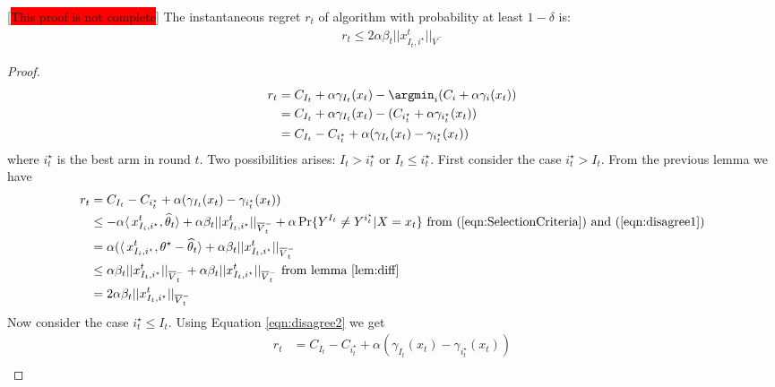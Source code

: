 \begin{theorem}
	\label{thm:ir}[\colorbox{red}{This proof is not complete}]
	The instantaneous regret $r_t$ of algorithm with probability at least $1-\delta$ is:
	\begin{align*}
	r_t \le 2\alpha \beta_t ||x_{I_t, i^\star}^t||_{\overline{V}^-}
	\end{align*}
\end{theorem}
\begin{proof}
	\begin{align*}
	r_t &= C_{I_t} + \alpha\gamma_{I_t}(x_t) - \argmin_i(C_i + \alpha\gamma_i(x_t)) \\
	&= C_{I_t} + \alpha\gamma_{I_t}(x_t) - (C_{i^\star_t} + \alpha\gamma_{i^\star_t}(x_t)) \\
	&= C_{I_t} - C_{i^\star_t} + \alpha(\gamma_{I_t}(x_t) - \gamma_{i^\star_t}(x_t)) \\
	\end{align*}
where $i_t^\star$ is the best arm in round $t$. Two possibilities arises: $I_t > i_t^\star$ or $I_t \leq i_t^\star$. First consider the case $i^\star_t > I_t$. From the previous lemma we have
	\begin{align*}
	r_t &= C_{I_t} - C_{i^\star_t} + \alpha(\gamma_{I_t}(x_t) - \gamma_{i^\star_t}(x_t)) \\
	&\le  -\alpha\langle\,x_{I_i,i^\star}^t,\widehat{\theta}_t\rangle + \alpha \beta_t||x_{I_t, i^\star}^t||_{\overline{V}^-_t} + \alpha \Pr\{Y^{I_t}\neq Y^{i^\star_t}|X=x_t\} \mbox{     from (\ref{eqn:SelectionCriteria}) and (\ref{eqn:disagree1})}\\ 
	&= \alpha(\langle\,x_{I_i,i^\star}^t, \theta^\star-\widehat{\theta}_t\rangle  + \alpha \beta_t||x_{I_t, i^\star}^t||_{\overline{V}^-_t} \\
	&\le \alpha \beta_t||x_{I_t, i^\star}^t||_{\overline{V}^-_t} + \alpha \beta_t||x_{I_t, i^\star}^t||_{\overline{V}^-_t} \text{ from lemma~\ref{lem:diff}}\\
	&= 2\alpha \beta_t||x_{I_t, i^\star}^t||_{\overline{V}^-_t}
	\end{align*}
Now consider the case 	$i^\star_t \leq I_t$. Using Equation \ref{eqn:disagree2} we get
\begin{align*}
r_t &= C_{I_t} - C_{i^\star_t} + \alpha(\gamma_{I_t}(x_t) - \gamma_{i^\star_t}(x_t)) \\

\end{align*}
\end{proof}
